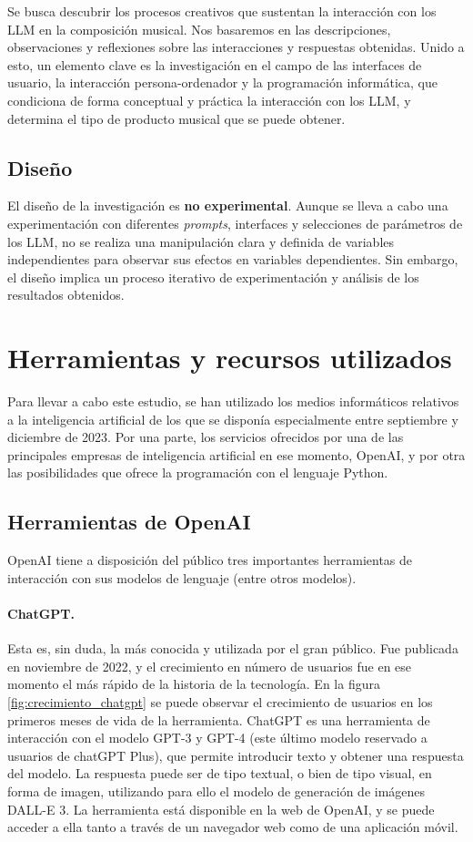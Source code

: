 Se busca descubrir los procesos creativos que sustentan la interacción con los LLM en la composición musical. Nos basaremos en las descripciones, observaciones y reflexiones sobre las interacciones y respuestas obtenidas. Unido a esto, un elemento clave es la investigación en el campo de las interfaces de usuario, la interacción persona-ordenador y la programación informática, que condiciona de forma conceptual y práctica la interacción con los LLM, y determina el tipo de producto musical que se puede obtener.

\subsection{Diseño}
El diseño de la investigación es \textbf{no experimental}. Aunque se lleva a cabo una experimentación con diferentes \textit{prompts}, interfaces y selecciones de parámetros de los LLM, no se realiza una manipulación clara y definida de variables independientes para observar sus efectos en variables dependientes. Sin embargo, el diseño implica un proceso iterativo de experimentación y análisis de los resultados obtenidos.

\section{Herramientas y recursos utilizados}

Para llevar a cabo este estudio, se han utilizado los medios informáticos relativos a la inteligencia artificial de los que se disponía especialmente entre septiembre y diciembre de 2023. Por una parte, los servicios ofrecidos por una de las principales empresas de inteligencia artificial en ese momento, OpenAI, y por otra las posibilidades que ofrece la programación con el lenguaje Python. 

    \subsection{Herramientas de OpenAI}

    OpenAI tiene a disposición del público tres importantes herramientas de interacción con sus modelos de lenguaje (entre otros modelos). 

        \paragraph{ChatGPT.} Esta es, sin duda, la más conocida y utilizada por el gran público. Fue publicada en noviembre de 2022, y el crecimiento en número de usuarios fue en ese momento el más rápido de la historia de la tecnología. En la figura \ref{fig:crecimiento_chatgpt} se puede observar el crecimiento de usuarios en los primeros meses de vida de la herramienta. ChatGPT es una herramienta de interacción con el modelo GPT-3 y GPT-4 (este último modelo reservado a usuarios de chatGPT Plus), que permite introducir texto y obtener una respuesta del modelo. La respuesta puede ser de tipo textual, o bien de tipo visual, en forma de imagen, utilizando para ello el modelo de generación de imágenes DALL-E 3. La herramienta está disponible en la web de OpenAI, y se puede acceder a ella tanto a través de un navegador web como de una aplicación móvil.


